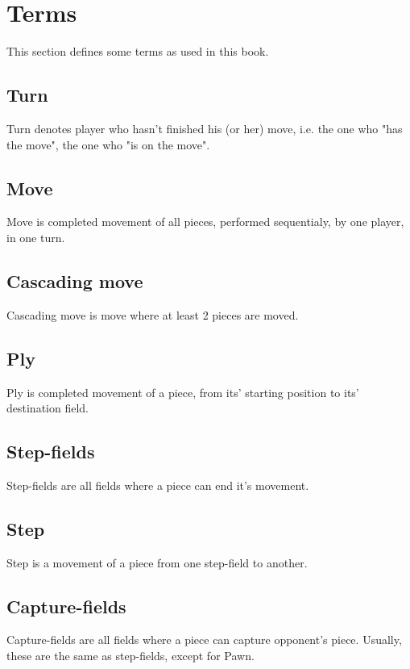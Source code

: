 
\chapter*{Terms}
This section defines some terms as used in this book.

\section*{Turn}
Turn denotes player who hasn't finished his (or her) move, i.e. the one who "has the move",
the one who "is on the move".

\section*{Move}
Move is completed movement of all pieces, performed sequentialy, by one player, in one turn.

\section*{Cascading move}
Cascading move is move where at least 2 pieces are moved.

\section*{Ply}
Ply is completed movement of a piece, from its' starting position to its' destination field.

\section*{Step-fields}
Step-fields are all fields where a piece can end it's movement.

\section*{Step}
Step is a movement of a piece from one step-field to another.

\section*{Capture-fields}
Capture-fields are all fields where a piece can capture opponent's piece.
Usually, these are the same as step-fields, except for Pawn.

